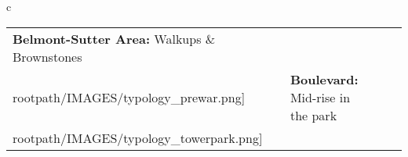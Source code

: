 \begin{table}[H]
        \begin{tabular}{c}
        \begin{tabular}{m{1.25in} m{2in} m{.1in} m{1.25in} m{2in}}
\textbf{Belmont-Sutter Area:} {Walkups \& Brownstones} & \texttt{[image: \\rootpath/IMAGES/typology\_prewar.png]} & & \textbf{Boulevard:} {Mid-rise in the park} & \texttt{[image: \\rootpath/IMAGES/typology\_towerpark.png]}
\end{tabular}\end{tabular}
        \end{table}